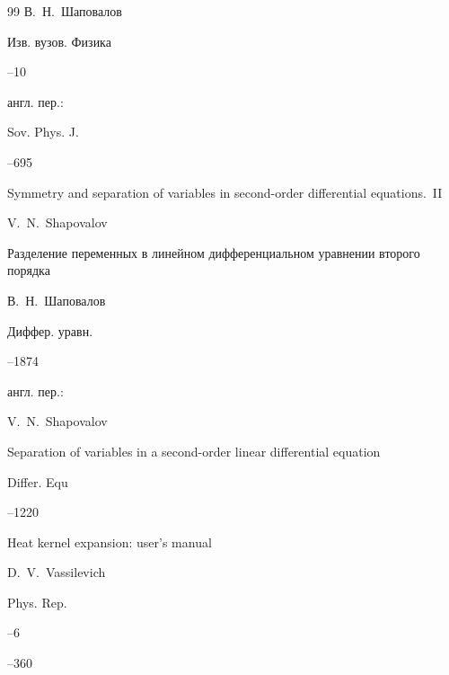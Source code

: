 \begin{thebibliography}{99}
\by В.~Н.~Шаповалов

\jour Изв. вузов. Физика



--10

\transl англ. пер.:~

\jour Sov. Phys. J.




--695

\paper Symmetry and separation of variables in second-order differential equations.~II

\by V.~N.~Shapovalov 






\paper Разделение переменных в линейном дифференциальном уравнении второго порядка

\by В.~Н.~Шаповалов

\jour Диффер. уравн.




--1874

\transl англ. пер.:~

\by V.~N.~Shapovalov

\paper Separation of variables in a second-order linear differential equation

\jour Differ. Equ




--1220






\paper Heat kernel expansion: user's manual

\by D.~V.~Vassilevich

\jour Phys. Rep.



--6

--360







\end{thebibliography}
